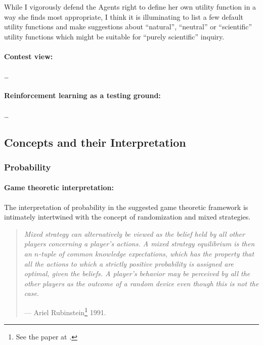 \documentclass{article}
\begin{document}
While I vigorously defend the Agents right to define her own utility function in a way she finds most appropriate, I think it is illuminating to list a few default utility functions and make suggestions about ``natural'', ``neutral'' or ``scientific'' utility functions which might be suitable for ``purely scientific'' inquiry.


\paragraph{Contest view:}
\dots


\paragraph{Reinforcement learning as a testing ground:}
\dots


\subsection*{Concepts and their Interpretation}

\subsubsection*{Probability}

\paragraph{Game theoretic interpretation:}
The interpretation of probability in the suggested game theoretic framework is intimately intertwined with the concept of randomization and mixed strategies.

    \begin{quote}
    {\it
    Mixed strategy can alternatively be viewed as the belief held by all other players concerning a player's actions. A mixed strategy equilibrium is then an $n$-tuple of common knowledge expectations, which has the property that all the actions to which a strictly positive probability is assigned are optimal, given the beliefs. A player's behavior may be perceived by all the other players as the outcome of a random device even though this is not the case.
    }
    
    \hfill --- Ariel Rubinstein\footnote{See the paper at \cite{paper:Rubinstein1991}.} 1991.
    \end{quote}
\end{document}
